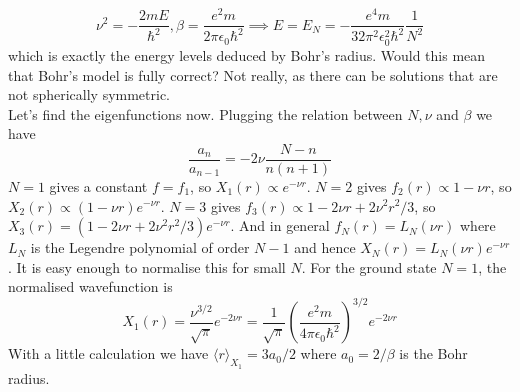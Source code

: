 $$\nu^2=-\frac{2mE}{\hbar^2},\beta=\frac{e^2m}{2\pi\epsilon_0\hbar^2}\implies E=E_N=-\frac{e^4m}{32\pi^2\epsilon_0^2\hbar^2}\frac{1}{N^2}$$
which is exactly the energy levels deduced by Bohr's radius.
Would this mean that Bohr's model is fully correct?
Not really, as there can be solutions that are not spherically symmetric.\\
Let's find the eigenfunctions now.
Plugging the relation between $N,\nu$ and $\beta$ we have
$$\frac{a_n}{a_{n-1}}=-2\nu\frac{N-n}{n(n+1)}$$
$N=1$ gives a constant $f=f_1$, so $X_1(r)\propto e^{-\nu r}$.
$N=2$ gives $f_2(r)\propto 1-\nu r$, so $X_2(r)\propto (1-\nu r)e^{-\nu r}$.
$N=3$ gives $f_3(r)\propto 1-2\nu r+2\nu^2r^2/3$, so $X_3(r)=(1-2\nu r+2\nu^2r^2/3)e^{-\nu r}$.
And in general $f_N(r)=L_N(\nu r)$ where $L_N$ is the Legendre polynomial of order $N-1$ and hence $X_N(r)=L_N(\nu r)e^{-\nu r}$.
It is easy enough to normalise this for small $N$.
For the ground state $N=1$, the normalised wavefunction is
$$X_1(r)=\frac{\nu^{3/2}}{\sqrt{\pi}}e^{-2\nu r}=\frac{1}{\sqrt\pi}\left( \frac{e^2m}{4\pi \epsilon_0\hbar^2} \right)^{3/2}e^{-2\nu r}$$
With a little calculation we have $\langle r\rangle_{X_1}=3a_0/2$ where $a_0=2/\beta$ is the Bohr radius.
